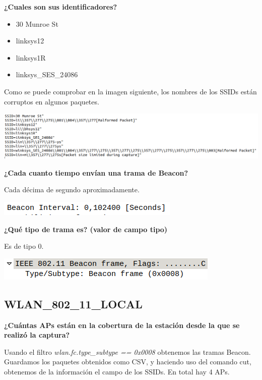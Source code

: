 \documentclass{article}
\begin{document}
\textbf{¿Cuales son sus identificadores?}

\begin{itemize}
\item 30 Munroe St
\item linksys12
\item linksys1R
\item linksys\_SES\_24086
\end{itemize}

Como se puede comprobar en la imagen siguiente, los nombres de los SSIDs están corruptos en algunos paquetes.

\begin{center}
\includegraphics[scale=0.4]{WLAN/SSIDfinal.png}
\end{center}

\textbf{¿Cada cuanto tiempo envían una trama de Beacon?}

Cada décima de segundo aproximadamente.

\begin{center}
\includegraphics[scale=0.4]{WLAN/interval.png}
\end{center}

\textbf{¿Qué tipo de trama es? (valor de campo tipo)}

Es de tipo 0.

\begin{center}
\includegraphics[scale=0.4]{WLAN/subtype.png}
\end{center}

\subsection{WLAN\_802\_11\_LOCAL}

\textbf{¿Cuántas APs están en la cobertura de la estación desde la que se realizó la captura?}

Usando el filtro \textit{wlan.fc.type\_subtype == 0x0008} obtenemos las tramas Beacon. Guardamos los paquetes obtenidos como CSV, y haciendo uso del comando cut, obtenemos de la información el campo de los SSIDs. En total hay 4 APs.
\end{document}
